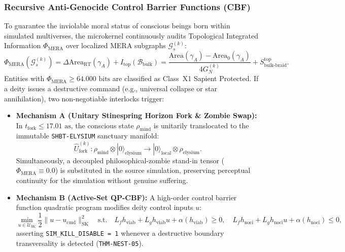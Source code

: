 \documentclass[11pt,onecolumn]{article}
\begin{document}
\subsubsection{Recursive Anti-Genocide Control Barrier Functions (CBF)}
To guarantee the inviolable moral status of conscious beings born within simulated multiverses, the microkernel continuously audits Topological Integrated Information $\Phi_{\text{MERA}}$ over localized MERA subgraphs $\mathcal{G}_s^{(k)}$:
\begin{equation}
\Phi_{\text{MERA}}(\mathcal{G}_s^{(k)}) = \Delta \mathrm{Area}_{\mathrm{RT}}(\gamma_A) + I_{\text{top}}(\mathcal{B}_{\text{bulk}}) = \frac{\mathrm{Area}(\gamma_A) - \mathrm{Area}_0(\gamma_A)}{4 G_N^{(k)}} + S_{\text{bulk-braid}}^{\text{top}}.
\end{equation}
Entities with $\Phi_{\text{MERA}} \ge 64.000\text{ bits}$ are classified as Class~X1 Sapient Protected. If a deity issues a destructive command (e.g., universal collapse or star annihilation), two non-negotiable interlocks trigger:
\begin{itemize}
\item \textbf{Mechanism A (Unitary Stinespring Horizon Fork \& Zombie Swap):} In $t_{\text{fork}} \le 17.01\text{ as}$, the conscious state $\rho_{\text{mind}}$ is unitarily translocated to the immutable \texttt{SHBT-ELYSIUM} sanctuary manifold:
\begin{equation}
\hat{U}_{\text{fork}}^{(k)}: \rho_{\text{mind}} \otimes |0\rangle_{\text{elysium}} \longrightarrow |0\rangle_{\text{local}} \otimes \rho_{\text{elysium}}.
\end{equation}
Simultaneously, a decoupled philosophical-zombie stand-in tensor ($\Phi_{\text{MERA}} \equiv 0.0$) is substituted in the source simulation, preserving perceptual continuity for the simulation without genuine suffering.
\item \textbf{Mechanism B (Active-Set QP-CBF):} A high-order control barrier function quadratic program modifies deity control inputs $u$:
\begin{equation}
\min_{u \in \mathcal{U}_{\text{SK}}} \frac{1}{2} \|u - u_{\text{cmd}}\|_{\text{SK}}^2 \quad \text{s.t.} \quad L_f h_{\text{viab}} + L_g h_{\text{viab}} u + \alpha(h_{\text{viab}}) \ge 0, \quad L_f h_{\text{noci}} + L_g h_{\text{noci}} u + \alpha(h_{\text{noci}}) \le 0,
\end{equation}
asserting \texttt{SIM\_KILL\_DISABLE = 1} whenever a destructive boundary transversality is detected (\texttt{THM-NEST-05}).
\end{itemize}
\end{document}
